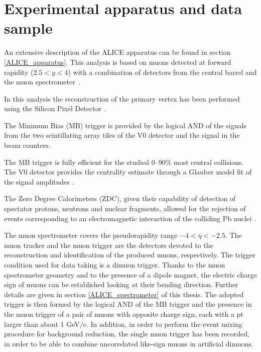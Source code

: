\section{Experimental apparatus and data sample}

An extensive description of the ALICE apparatus can be found in section \ref{ALICE_apparatus}.
This analysis is based on muons detected at forward rapidity ($2.5<y<4$) with a combination of detectors from the central barrel and the muon spectrometer~\cite{Aamodt:2011gj}. 

In this analysis the reconstruction of the primary vertex has been performed using the Silicon Pixel Detector \cite{Aamodt:2010aa}.

The Minimum Bias (MB) trigger is provided by the logical AND of the signals from the two scintillating array tiles of the V0 detector \cite{Abbas:2013taa} and the signal in the beam counters.

The MB trigger is fully efficient for the studied 0--90\% most central collisions.
The V0 detector provides the centrality estimate through a Glauber model fit of the signal amplitudes \cite{Abelev:2013qoq,Adam:2015ptt}.

The Zero Degree Calorimeters (ZDC), given their capability of detection of spectator protons, neutrons and nuclear fragments, allowed for the rejection of events corresponding to an electromagnetic interaction of the colliding Pb nuclei \cite{ALICE:2012aa}.

The muon spectrometer covers the pseudorapidity range $-4<\eta<-2.5$.
The muon tracker and the muon trigger are the detectors devoted to the reconstruction and identification of the produced muons, respectively.
The trigger condition used for data taking is a dimuon trigger.
Thanks to the muon spectrometer geometry and to the presence of a dipole magnet, the electric charge sign of muons can be established looking at their bending direction.
Further details are given in section \ref{ALICE_spectrometer} of this thesis.
The adopted trigger is then formed by the logical AND of the MB trigger and the presence in the muon trigger of a pair of muons with opposite charge sign, each with a pt larger than about 1 GeV/c.
In addition, in order to perform the event mixing procedure for background reduction, the single muon trigger has been recorded, in order to be able to combine uncorrelated like-sign muons in artificial dimuons.

